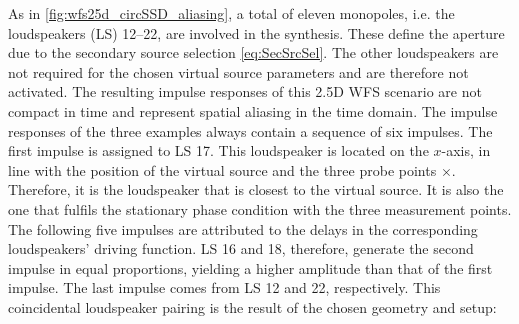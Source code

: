 As in \myfig\ref{fig:wfs25d_circSSD_aliasing}, a total of eleven monopoles,
i.e. the loudspeakers (LS) 12--22, are involved in the synthesis.
These define the aperture due to the secondary source selection
\myeq\eqref{eq:SecSrcSel}.
%
The other loudspeakers are not required for the chosen virtual source parameters
and are therefore not activated.
%
The resulting impulse responses of this 2.5D WFS scenario are not compact in
time and represent spatial aliasing in the time domain.
%
The impulse responses of the three examples always contain a sequence of six
impulses.
%
The first impulse is assigned to LS 17.
%
This loudspeaker is located on the $x$-axis, in line with the
position of the virtual source and the three probe points $\times$.
Therefore, it is the loudspeaker that is closest to the virtual source.
It is also the one that fulfils the stationary phase condition with the
three measurement points.
%
The following five impulses are attributed to the delays in the
corresponding loudspeakers' driving function.
%
LS 16 and 18, therefore, generate the second impulse in equal proportions,
yielding a higher amplitude than that of the first impulse.
%
The last impulse comes from LS 12 and 22, respectively.
%
This coincidental loudspeaker pairing is the result of the chosen
geometry and setup:
%
